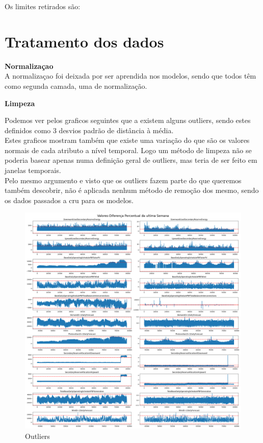 Os limites retirados são:




\section{Tratamento dos dados \label{se:data_treatment}}

\textbf{Normalizaçao} \\
A normalizaçao foi deixada por ser aprendida nos modelos, sendo que todos têm como segunda camada, uma de normalização.

\textbf{Limpeza}

Podemos ver pelos graficos seguintes que a existem alguns outliers, sendo estes definidos como 3 desvios padrão de distância à média. \\
Estes graficos mostram também que existe uma variação do que são os valores normais de cada atributo a nível temporal. Logo um método de limpeza não se poderia basear apenas numa definição geral de outliers, mas teria de ser feito em janelas temporais. \\
Pelo mesmo argumento e visto que os outliers fazem parte do que queremos também descobrir, não é aplicada nenhum método de remoção dos mesmo, sendo os dados passados a cru para os modelos. \\


\begin{figure}[H]
  \centering
  \includegraphics[width=\textwidth]{../plots/Outliers_3stds.png}
  \caption{Outliers}
\end{figure}

